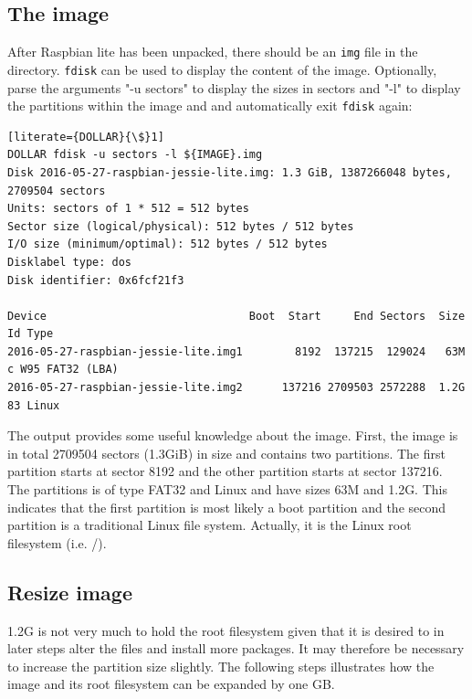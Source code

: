 
\subsection{The image}

After Raspbian lite has been unpacked, there should be an \texttt{img} file in the directory.
\texttt{fdisk} can be used to display the content of the image. Optionally, parse the arguments
"-u sectors" to display the sizes in sectors and "-l" to display the partitions within the
image and and automatically exit \texttt{fdisk} again:

\begin{lstlisting}[literate={DOLLAR}{\$}1]
DOLLAR fdisk -u sectors -l ${IMAGE}.img
Disk 2016-05-27-raspbian-jessie-lite.img: 1.3 GiB, 1387266048 bytes, 2709504 sectors
Units: sectors of 1 * 512 = 512 bytes
Sector size (logical/physical): 512 bytes / 512 bytes
I/O size (minimum/optimal): 512 bytes / 512 bytes
Disklabel type: dos
Disk identifier: 0x6fcf21f3

Device                               Boot  Start     End Sectors  Size Id Type
2016-05-27-raspbian-jessie-lite.img1        8192  137215  129024   63M  c W95 FAT32 (LBA)
2016-05-27-raspbian-jessie-lite.img2      137216 2709503 2572288  1.2G 83 Linux
\end{lstlisting}
\FloatBarrier

The output provides some useful knowledge about the image. First, the image is in total
2709504 sectors (1.3GiB) in size and contains two
partitions. The first partition starts at sector 8192 and
the other partition starts at sector 137216. The partitions is of type FAT32
and Linux and have sizes 63M and 1.2G. This indicates that the first partition
is most likely a boot partition and the second partition is a traditional Linux file
system. Actually, it is the Linux root filesystem (i.e. /).

\subsection{Resize image}
1.2G is not very much to hold the root filesystem given that it is desired to
in later steps alter the files and install more packages. It may therefore be
necessary to increase the partition size slightly.
The following steps illustrates how the image and its root filesystem
can be expanded by one \ac{GB}.

